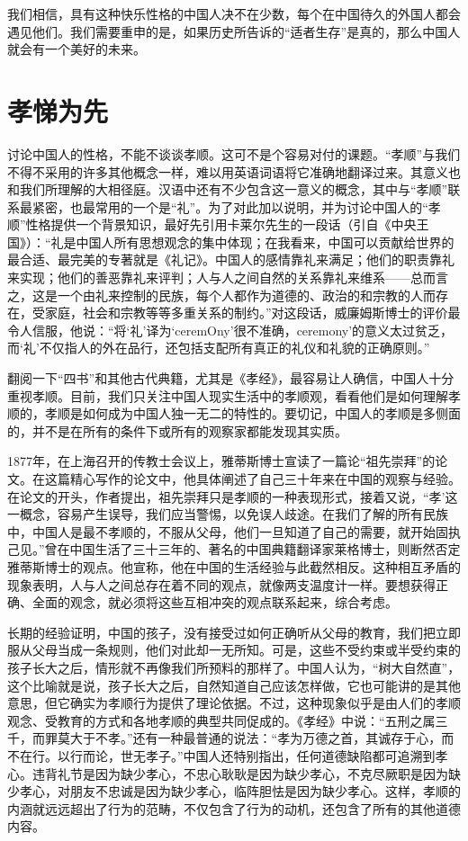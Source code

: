 \documentclass[12pt,oneside]{book}
\begin{document}
\begin{common-format}
我们相信，具有这种快乐性格的中国人决不在少数，每个在中国待久的外国人都会遇见他们。我们需要重申的是，如果历史所告诉的“适者生存”是真的，那么中国人就会有一个美好的未来。 


\chapter{孝悌为先}
讨论中国人的性格，不能不谈谈孝顺。这可不是个容易对付的课题。“孝顺”与我们不得不采用的许多其他概念一样，难以用英语词语将它准确地翻译过来。其意义也和我们所理解的大相径庭。汉语中还有不少包含这一意义的概念，其中与“孝顺”联系最紧密，也最常用的一个是“礼”。为了对此加以说明，并为讨论中国人的“孝顺”性格提供一个背景知识，最好先引用卡莱尔先生的一段话（引自《中央王国》）：“礼是中国人所有思想观念的集中体现；在我看来，中国可以贡献给世界的最合适、最完美的专著就是《礼记》。中国人的感情靠礼来满足；他们的职责靠礼来实现；他们的善恶靠礼来评判；人与人之间自然的关系靠礼来维系——总而言之，这是一个由礼来控制的民族，每个人都作为道德的、政治的和宗教的人而存在，受家庭，社会和宗教等等多重关系的制约。”对这段话，威廉姆斯博士的评价最令人信服，他说：“将‘礼’译为‘ceremOny’很不准确，ceremony’的意义太过贫乏，而‘礼’不仅指人的外在品行，还包括支配所有真正的礼仪和礼貌的正确原则。” 

翻阅一下“四书”和其他古代典籍，尤其是《孝经》，最容易让人确信，中国人十分重视孝顺。目前，我们只关注中国人现实生活中的孝顺观，看看他们是如何理解孝顺的，孝顺是如何成为中国人独一无二的特性的。要切记，中国人的孝顺是多侧面的，并不是在所有的条件下或所有的观察家都能发现其实质。 

1877年，在上海召开的传教士会议上，雅蒂斯博士宣读了一篇论“祖先崇拜”的论文。在这篇精心写作的论文中，他具体阐述了自己三十年来在中国的观察与经验。在论文的开头，作者提出，祖先崇拜只是孝顺的一种表现形式，接着又说，“孝’这一概念，容易产生误导，我们应当警惕，以免误人歧途。在我们了解的所有民族中，中国人是最不孝顺的，不服从父母，他们一旦知道了自己的需要，就开始固执己见。”曾在中国生活了三十三年的、著名的中国典籍翻译家莱格博士，则断然否定雅蒂斯博士的观点。他宣称，他在中国的生活经验与此截然相反。这种相互矛盾的现象表明，人与人之间总存在着不同的观点，就像两支温度计一样。要想获得正确、全面的观念，就必须将这些互相冲突的观点联系起来，综合考虑。 

长期的经验证明，中国的孩子，没有接受过如何正确听从父母的教育，我们把立即服从父母当成一条规则，他们对此却一无所知。可是，这些不受约束或半受约束的孩子长大之后，情形就不再像我们所预料的那样了。中国人认为，“树大自然直”，这个比喻就是说，孩子长大之后，自然知道自己应该怎样做，它也可能讲的是其他意思，但它确实为孝顺行为提供了理论依据。不过，这种现象似乎是由人们的孝顺观念、受教育的方式和各地孝顺的典型共同促成的。《孝经》中说：“五刑之属三千，而罪莫大于不孝。”还有一种最普通的说法：“孝为万德之首，其诚存于心，而不在行。以行而论，世无孝子。”中国人还特别指出，任何道德缺陷都可追溯到孝心。违背礼节是因为缺少孝心，不忠心耿耿是因为缺少孝心，不克尽厥职是因为缺少孝心，对朋友不忠诚是因为缺少孝心，临阵胆怯是因为缺少孝心。这样，孝顺的内涵就远远超出了行为的范畴，不仅包含了行为的动机，还包含了所有的其他道德内容。 


\end{common-format}
\end{document}
